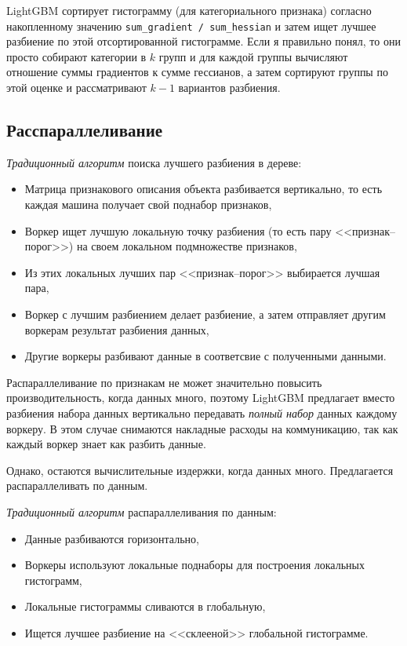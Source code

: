 \documentclass[%
	11pt,
	a4paper,
	utf8,
		]{article}
\begin{document}
LightGBM сортирует гистограмму (для категориального признака) согласно накопленному значению \verb|sum_gradient / sum_hessian| и затем ищет лучшее разбиение по этой отсортированной гистограмме. Если я правильно понял, то они просто собирают категории в $ k $ групп и для каждой группы вычисляют отношение суммы градиентов к сумме гессианов, а затем сортируют группы по этой оценке и рассматривают $ k - 1 $ вариантов разбиения. 

\subsection{Расспараллеливание}

\emph{Традиционный алгоритм} поиска лучшего разбиения в дереве:
\begin{itemize}
	\item Матрица признакового описания объекта разбивается вертикально, то есть каждая машина получает свой поднабор признаков,
	
	\item Воркер ищет лучшую локальную точку разбиения (то есть пару <<признак--порог>>) на своем локальном подмножестве признаков,
	
	\item Из этих локальных лучших пар <<признак--порог>> выбирается лучшая пара,
	
	\item Воркер с лучшим разбиением делает разбиение, а затем отправляет другим воркерам результат разбиения данных,
	
	\item Другие воркеры разбивают данные в соответсвие с полученными данными.
\end{itemize}

Распараллеливание по признакам не может значительно повысить производительность, когда данных много, поэтому LightGBM предлагает вместо разбиения набора данных вертикально передавать \emph{полный набор} данных каждому воркеру. В этом случае снимаются накладные расходы на коммуникацию, так как каждый воркер знает как разбить данные.

Однако, остаются вычислительные издержки, когда данных много. Предлагается распараллеливать по данным.

\emph{Традиционный алгоритм} распараллеливания по данным:
\begin{itemize}
	\item Данные разбиваются горизонтально,
	
	\item Воркеры используют локальные поднаборы для построения локальных гистограмм,
	
	\item Локальные гистограммы сливаются в глобальную,
	
	\item Ищется лучшее разбиение на <<склееной>> глобальной гистограмме.
\end{itemize}
\end{document}
